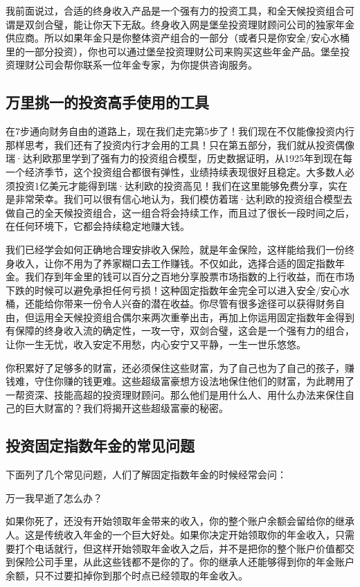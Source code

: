 我前面说过，合适的终身收入产品是一个强有力的投资工具，和全天候投资组合可谓是双剑合璧，能让你天下无敌。终身收入网是堡垒投资理财顾问公司的独家年金供应商。所以如果年金只是你整体资产组合的一部分（或者只是你安全/安心水桶里的一部分投资），你也可以通过堡垒投资理财公司来购买这些年金产品。堡垒投资理财公司会帮你联系一位年金专家，为你提供咨询服务。

\subsection{万里挑一的投资高手使用的工具}

在7步通向财务自由的道路上，现在我们走完第5步了！我们现在不仅能像投资内行那样思考，我们还有了投资内行才会用的工具！只在第五部分，我们就从投资偶像瑞·达利欧那里学到了强有力的投资组合模型，历史数据证明，从1925年到现在每一个经济季节，这个投资组合都很有弹性，业绩持续表现很好且稳定。大多数人必须投资1亿美元才能得到瑞·达利欧的投资高见！我们在这里能够免费分享，实在是非常荣幸。我们可以很有信心地认为，我们模仿着瑞·达利欧的投资组合模型去做自己的全天候投资组合，这一组合将会持续工作，而且过了很长一段时间之后，在任何环境下，它都会持续稳定地赚大钱。

我们已经学会如何正确地合理安排收入保险，就是年金保险，这样能给我们一份终身收入，让你不用为了养家糊口去工作赚钱。不仅如此，选择合适的固定指数年金。我们存到年金里的钱可以百分之百地分享股票市场指数的上行收益，而在市场下跌的时候可以避免承担任何亏损！这种固定指数年金完全可以进入安全/安心水桶，还能给你带来一份令人兴奋的潜在收益。你尽管有很多途径可以获得财务自由，但运用全天候投资组合偶尔来两次重拳出击，再加上你运用固定指数年金得到有保障的终身收入流的确定性，一攻一守，双剑合璧，这会是一个强有力的组合，让你一生无忧，收入安定不用愁，内心安宁又平静，一生一世乐悠悠。

你积累好了足够多的财富，还必须保住这些财富，为了自己也为了自己的孩子，赚钱难，守住你赚的钱更难。这些超级富豪想方设法地保住他们的财富，为此聘用了一帮资深、技能高超的投资理财顾问。那么他们是用什么人、用什么办法来保住自己的巨大财富的？我们将揭开这些超级富豪的秘密。

\subsection{投资固定指数年金的常见问题}

下面列了几个常见问题，人们了解固定指数年金的时候经常会问：

万一我早逝了怎么办？

如果你死了，还没有开始领取年金带来的收入，你的整个账户余额会留给你的继承人。这是传统收入年金的一个巨大好处。如果你决定开始领取你的年金收入，只需要打个电话就行，但这样开始领取年金收入之后，并不是把你的整个账户价值都交到保险公司手里，从此这些钱都不是你的了。你的继承人还能够得到你的年金账户余额，只不过要扣掉你到那个时点已经领取的年金收入。

